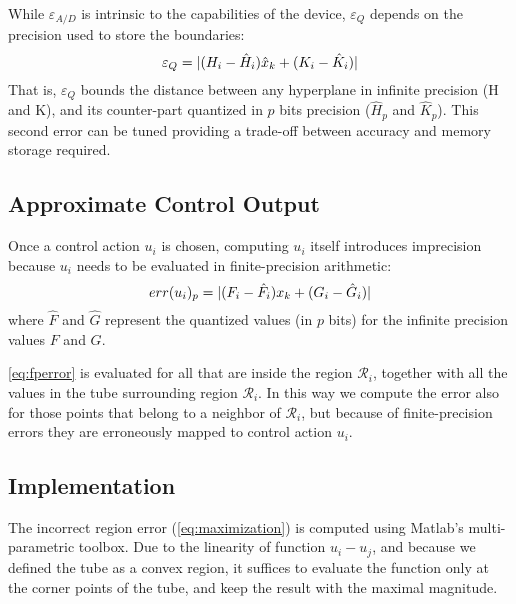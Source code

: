 While $\varepsilon_{A/D}$ is intrinsic to the capabilities of the device,
$\varepsilon_{Q}$ depends on the precision used to store the boundaries:
\begin{equation}\label{eq:quantizationlines}
  \varepsilon_{Q} = |(H_i - \hat{H}_i) \hat{x}_{k} + (K_i - \hat{K}_i)|
\end{equation}
That is, $\varepsilon_{Q}$ bounds the distance between any hyperplane in infinite
precision (H and K), and its counter-part quantized in $p$ bits precision
($\hat{H}_{p}$ and $\hat{K}_{p}$).
This second error can be tuned providing a trade-off between accuracy and
memory storage required.


\subsection{Approximate Control Output}

Once a control action $u_i$ is chosen, computing $u_{i}$ itself introduces
imprecision because $u_i$ needs to be evaluated in finite-precision arithmetic:
\begin{equation}\label{eq:fperror}
  err(u_{i})_{p} = | (F_i - \hat{F}_{i}) x_{k} + ( G_i - \hat{G}_{i} ) |
\end{equation}
where $\hat{F}$ and $\hat{G}$ represent the quantized values (in $p$ bits) for
the infinite precision values $F$ and $G$.

\autoref{eq:fperror} is evaluated for all \statevarmath that are inside the
region $\mathcal{R}_i$, together with all the values in the tube surrounding
region $\mathcal{R}_i$.
In this way we compute the error also for those points that belong to a neighbor
of $\mathcal{R}_i$, but because of finite-precision errors they are erroneously
mapped to control action $u_i$.


\subsection{Implementation}

The incorrect region error (\autoref{eq:maximization}) is computed using
Matlab's multi-parametric toolbox. Due to the linearity of function
$u_{i}-u_{j}$, and because we defined the tube as a convex region, it suffices
to evaluate the function only at the corner points of the tube, and keep the
result with the maximal magnitude.


